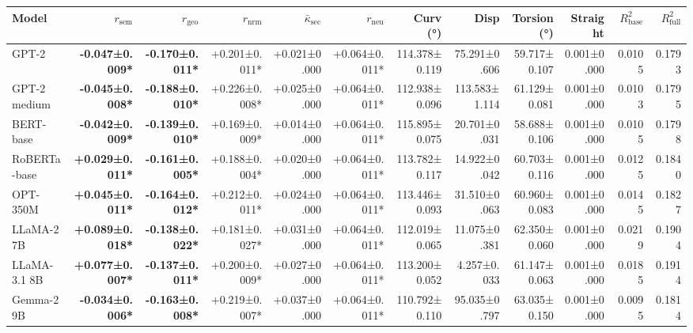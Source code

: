 \begin{table}[t]
\centering
\tiny
\setlength{\tabcolsep}{3pt}
\begin{tabular}{lrrrrrrrrrrr}
\toprule
Model & $r_\mathrm{sem}$ & $r_\mathrm{geo}$ & $r_\mathrm{nrm}$ & $\bar\kappa_\mathrm{sec}$ & $r_\mathrm{neu}$ & Curv (°) & Disp & Torsion (°) & Straight & $R^2_\mathrm{base}$ & $R^2_\mathrm{full}$ \\
\midrule
GPT-2 & \textbf{-0.047\tiny{±0.009*}} & \textbf{-0.170\tiny{±0.011*}} & +0.201\tiny{±0.011*} & +0.021\tiny{±0.000} & +0.064\tiny{±0.011*} & 114.378\tiny{±0.119} & 75.291\tiny{±0.606} & 59.717\tiny{±0.107} & 0.001\tiny{±0.000} & 0.0105 & 0.1793 \\
GPT-2 medium & \textbf{-0.045\tiny{±0.008*}} & \textbf{-0.188\tiny{±0.010*}} & +0.226\tiny{±0.008*} & +0.025\tiny{±0.000} & +0.064\tiny{±0.011*} & 112.938\tiny{±0.096} & 113.583\tiny{±1.114} & 61.129\tiny{±0.081} & 0.001\tiny{±0.000} & 0.0103 & 0.1795 \\
BERT-base & \textbf{-0.042\tiny{±0.009*}} & \textbf{-0.139\tiny{±0.010*}} & +0.169\tiny{±0.009*} & +0.014\tiny{±0.000} & +0.064\tiny{±0.011*} & 115.895\tiny{±0.075} & 20.701\tiny{±0.031} & 58.688\tiny{±0.106} & 0.001\tiny{±0.000} & 0.0105 & 0.1798 \\
RoBERTa-base & \textbf{+0.029\tiny{±0.011*}} & \textbf{-0.161\tiny{±0.005*}} & +0.188\tiny{±0.004*} & +0.020\tiny{±0.000} & +0.064\tiny{±0.011*} & 113.782\tiny{±0.117} & 14.922\tiny{±0.042} & 60.703\tiny{±0.116} & 0.001\tiny{±0.000} & 0.0125 & 0.1840 \\
OPT-350M & \textbf{+0.045\tiny{±0.011*}} & \textbf{-0.164\tiny{±0.012*}} & +0.212\tiny{±0.011*} & +0.024\tiny{±0.000} & +0.064\tiny{±0.011*} & 113.446\tiny{±0.093} & 31.510\tiny{±0.063} & 60.960\tiny{±0.083} & 0.001\tiny{±0.000} & 0.0145 & 0.1827 \\
LLaMA-2 7B & \textbf{+0.089\tiny{±0.018*}} & \textbf{-0.138\tiny{±0.022*}} & +0.181\tiny{±0.027*} & +0.031\tiny{±0.000} & +0.064\tiny{±0.011*} & 112.019\tiny{±0.065} & 11.075\tiny{±0.381} & 62.350\tiny{±0.060} & 0.001\tiny{±0.000} & 0.0219 & 0.1904 \\
LLaMA-3.1 8B & \textbf{+0.077\tiny{±0.007*}} & \textbf{-0.137\tiny{±0.011*}} & +0.200\tiny{±0.009*} & +0.027\tiny{±0.000} & +0.064\tiny{±0.011*} & 113.200\tiny{±0.052} & 4.257\tiny{±0.033} & 61.147\tiny{±0.063} & 0.001\tiny{±0.000} & 0.0185 & 0.1914 \\
Gemma-2 9B & \textbf{-0.034\tiny{±0.006*}} & \textbf{-0.163\tiny{±0.008*}} & +0.219\tiny{±0.007*} & +0.037\tiny{±0.000} & +0.064\tiny{±0.011*} & 110.792\tiny{±0.110} & 95.035\tiny{±0.797} & 63.035\tiny{±0.150} & 0.001\tiny{±0.000} & 0.0095 & 0.1814 \\

\end{tabular}
\end{table}
